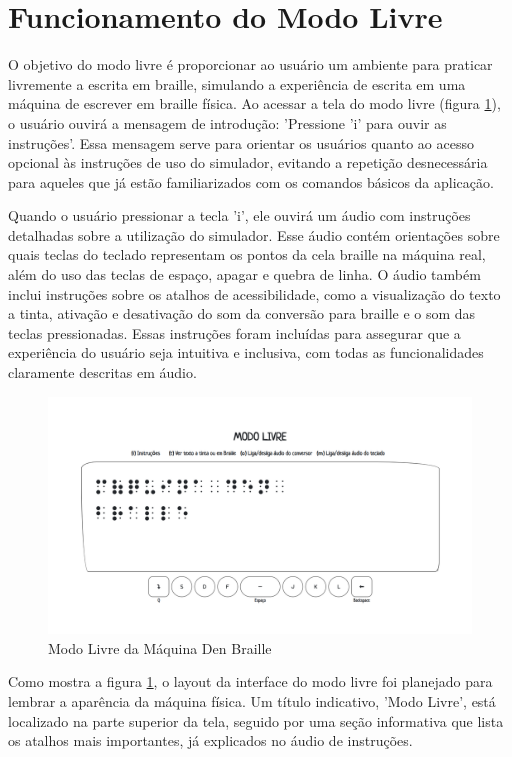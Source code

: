 \section{Funcionamento do Modo Livre}

O objetivo do modo livre é proporcionar ao usuário um ambiente para praticar livremente a escrita em braille, simulando a experiência de escrita em uma máquina de escrever em braille física. Ao acessar a tela do modo livre (figura \ref{fig:ch06-Modo Livre}), o usuário ouvirá a mensagem de introdução: 'Pressione 'i' para ouvir as instruções'. Essa mensagem serve para orientar os usuários quanto ao acesso opcional às instruções de uso do simulador, evitando a repetição desnecessária para aqueles que já estão familiarizados com os comandos básicos da aplicação.

Quando o usuário pressionar a tecla 'i', ele ouvirá um áudio com instruções detalhadas sobre a utilização do simulador. Esse áudio contém orientações sobre quais teclas do teclado representam os pontos da cela braille na máquina real, além do uso das teclas de espaço, apagar e quebra de linha. O áudio também inclui instruções sobre os atalhos de acessibilidade, como a visualização do texto a tinta, ativação e desativação do som da conversão para braille e o som das teclas pressionadas. Essas instruções foram incluídas para assegurar que a experiência do usuário seja intuitiva e inclusiva, com todas as funcionalidades claramente descritas em áudio.

\begin{figure}[h]
    \centering
    \includegraphics[scale=0.3]{ch06/assets/modo-livre.png}
    \decoRule
    \caption[Modo Livre]{Modo Livre da Máquina Den Braille}
    \label{fig:ch06-Modo Livre}
\end{figure}

Como mostra a figura \ref{fig:ch06-Modo Livre}, o layout da interface do modo livre foi planejado para lembrar a aparência da máquina física. Um título indicativo, 'Modo Livre', está localizado na parte superior da tela, seguido por uma seção informativa que lista os atalhos mais importantes, já explicados no áudio de instruções. 

